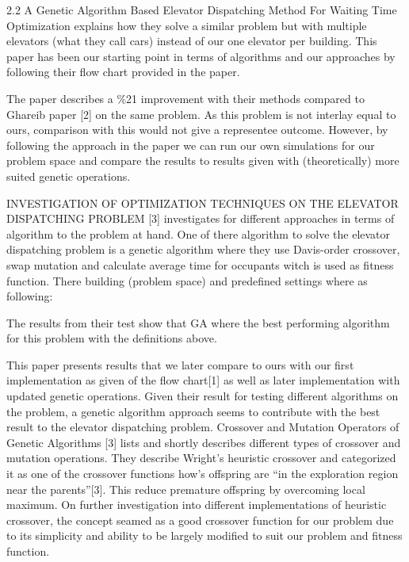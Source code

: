 2.2 
A Genetic Algorithm Based Elevator Dispatching Method For Waiting Time Optimization \cite{tartan2016genetic} explains how they solve a similar problem but with multiple elevators (what they call cars) instead of our one elevator per building. This paper has been our starting point in terms of algorithms and our approaches by following their flow chart provided in the paper.  
 
The paper describes a \%21 improvement with their methods compared to Ghareib paper [2] on the same problem. As this problem is not interlay equal to ours, comparison with this would not give a representee outcome. However, by following the approach in the paper we can run our own simulations for our problem space and compare the results to results given with (theoretically) more suited genetic operations.

INVESTIGATION OF OPTIMIZATION TECHNIQUES ON THE ELEVATOR DISPATCHING PROBLEM [3] investigates for different approaches in terms of algorithm to the problem at hand.  One of there algorithm to solve the elevator dispatching problem is a genetic algorithm where they use Davis-order crossover, swap mutation and calculate average time for occupants  witch is used as fitness function. There building (problem space) and predefined settings where as following: 
  
The results from their test show that GA where the best performing algorithm for this problem with the definitions above. 
 
This paper presents results that we later compare to ours with our first implementation as given of the flow chart[1] as well as later implementation with updated genetic operations. Given their result for testing different algorithms on the problem, a genetic algorithm approach seems to contribute with the best result to the elevator dispatching problem.
Crossover and Mutation Operators of Genetic Algorithms [3] lists and shortly describes different types of crossover and mutation operations. They describe Wright's heuristic crossover and categorized it as one of the crossover functions how’s offspring are “in the exploration region near the parents”[3]. This reduce premature offspring by overcoming local maximum. On further investigation into different implementations of heuristic crossover, the concept seamed as a good crossover function for our problem due to its simplicity and ability to be largely modified to suit our problem and fitness function.


